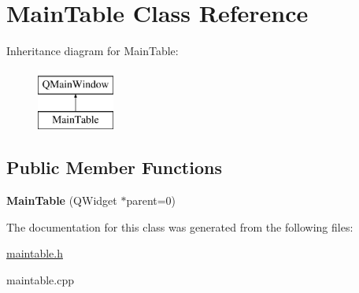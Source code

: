 \hypertarget{class_main_table}{\section{Main\-Table Class Reference}
\label{class_main_table}
}
Inheritance diagram for Main\-Table\-:\begin{figure}[H]
\begin{center}
\leavevmode
\includegraphics[height=2.000000cm]{class_main_table}
\end{center}
\end{figure}
\subsection*{Public Member Functions}
\begin{DoxyCompactItemize}
\item 
\hypertarget{class_main_table_a536fdc279aa0ed4e14cc25ab6f89a74d}{{\bfseries Main\-Table} (Q\-Widget $\ast$parent=0)}\label{class_main_table_a536fdc279aa0ed4e14cc25ab6f89a74d}

\end{DoxyCompactItemize}


The documentation for this class was generated from the following files\-:\begin{DoxyCompactItemize}
\item 
\hyperlink{maintable_8h}{maintable.\-h}\item 
maintable.\-cpp\end{DoxyCompactItemize}
